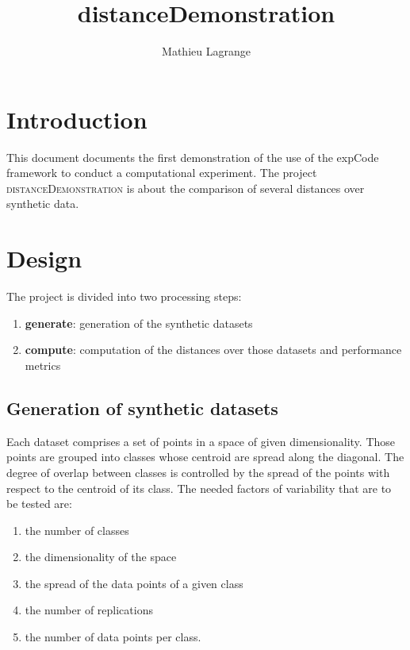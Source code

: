 \documentclass[12pt,a4paper,fleqn]{tufte-handout}
\title{distanceDemonstration}
\author{ Mathieu Lagrange }
\begin{document}
 
  
\maketitle 
  

\section{Introduction}

This document documents the first demonstration of the use of the expCode framework to conduct a computational experiment. The project \textsc{distanceDemonstration} is about the comparison of several distances over synthetic data.

\section{Design}

 The project is divided into two processing steps:
\begin{enumerate}
\item \textbf{generate}: generation of the synthetic datasets
\item \textbf{compute}: computation of the distances over those datasets and performance metrics
\end{enumerate}

\subsection{Generation of synthetic datasets}

Each dataset comprises a set of points in a space of given dimensionality. Those points are grouped into classes whose centroid are spread along the diagonal. The degree of overlap between classes is controlled by the spread of the points with respect to the centroid of its class. The needed factors of variability that are to be tested are:
\begin{enumerate}
\item the number of classes
\item the dimensionality of the space
\item the spread of the data points of a given class
\item the number of replications
\item the number of data points per class.
\end{enumerate}
\end{document}

